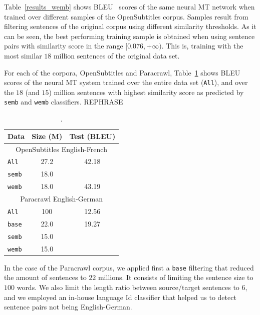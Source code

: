 \documentclass[11pt,a4paper]{article}
\begin{document}
Table~\ref{results_wemb} shows BLEU~\cite{P02-1040} scores of the same neural MT network when trained over different samples of the OpenSubtitles corpus.
Samples result from filtering sentences of the original corpus using different similarity thresholds.
As it can be seen, the best performing training sample is obtained when using sentence pairs with similarity score in the range $[0.076, +\infty)$. 
This is, training with the most similar $18$ million sentences of the original data set.

For each of the corpora, OpenSubtitles and Paracrawl, Table~\ref{results_nmt} shows BLEU scores of the neural MT system trained over the entire data set (\texttt{All}), and over the $18$ (and $15$) million sentences with highest similarity score as predicted by \texttt{semb} and \texttt{wemb} classifiers. REPHRASE

\begin{table}[h]
\small
\center
\begin{tabular}{lcc}
\hline
\bf Data & \bf Size (M) & \bf Test (BLEU) \\ %
\hline
\multicolumn{3}{c}{\scriptsize{OpenSubtitles English-French}} \\
\texttt{All}                    & 27.2 & 42.18 \\%
\texttt{semb}               & 18.0 & \\%
\texttt{wemb}              & 18.0 & 43.19 \\%
\hline
\multicolumn{3}{c}{\scriptsize{Paracrawl English-German}} \\
\texttt{All}                    & 100 & 12.56 \\ 
\texttt{base}                & 22.0 & 19.27 \\ 
\texttt{semb}               & 15.0 &  \\
\texttt{wemb}              & 15.0 &   \\
\hline
\end{tabular}
\caption{.}
\label{results_nmt}
\end{table}

In the case of the Paracrawl corpus, we applied first a \texttt{base} filtering that reduced the amount of sentences to $22$ millions. 
It consists of limiting the sentence size to $100$ words. 
We also limit the length ratio between source/target sentences to $6$, and we employed an in-house language Id classifier that helped us to detect sentence pairs not being English-German. 
\end{document}
